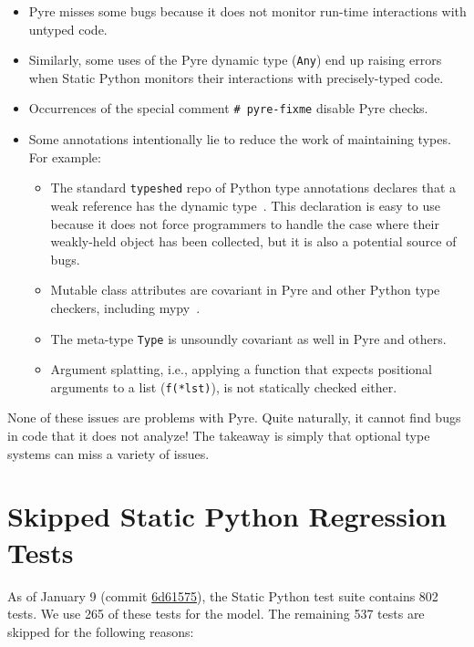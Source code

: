 \documentclass[english,cleveref,submission]{programming}
\newcommand{\SP}{Static Python}
\newcommand{\code}[1]{\texttt{#1}}
\newcommand{\numSPtest}{265}
\newcommand{\numSPtotal}{802} %
\newcommand{\numSPdiff}{537} %
\begin{document}
\begin{itemize}
  \item
    Pyre misses some bugs because it does not monitor run-time interactions
    with untyped code.

  \item
    Similarly, some uses of the Pyre dynamic type (\code{Any}) end up
    raising errors when \SP{} monitors their interactions with precisely-typed code.

  \item
    Occurrences of the special comment \lstinline$# pyre-fixme$ disable Pyre checks.

  \item
    Some annotations intentionally lie to reduce the work of maintaining types.
    For example:

    \begin{itemize}
      \item
        The standard \code{typeshed} repo of Python type annotations declares
        that a weak reference has the dynamic type~\cite{typeshed}.
        This declaration is easy to use because it does not force programmers
        to handle the case where their weakly-held object has been collected,
        but it is also a potential source of bugs.
      \item
        Mutable class attributes are covariant in Pyre and other
        Python type checkers, including mypy~\cite{mypy}.
      \item
        The meta-type \code{Type} is unsoundly covariant as well in Pyre
        and others.
      \item
        Argument splatting, i.e., applying a function that expects positional
        arguments to a list (\code{f(*lst)}), is not statically checked
        either.
    \end{itemize}

\end{itemize}

None of these issues are problems with Pyre.
Quite naturally, it cannot find bugs in code that it does not analyze!
The takeaway is simply that optional type systems can miss a variety of issues.


\section{Skipped \SP{} Regression Tests}
\label{a:banned-test}

As of January 9 (commit \href{https://github.com/facebookincubator/cinder/commit/6d61575e28b2d1f31a197f883486c5f012de98c1}{6d61575}),
the \SP{} test suite contains \numSPtotal{} tests.
We use \numSPtest{} of these tests for the model.
The remaining \numSPdiff{} tests are skipped for the following reasons:
\end{document}
